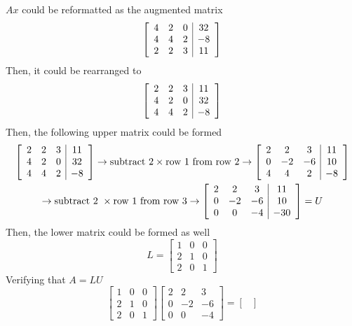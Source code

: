 \documentclass[10pt,letterpaper]{article}
\begin{document}
\begin{enumerate}
\color{TangGreen}
$Ax$ could be reformatted as the augmented matrix
$$\left[ \begin{array}{c c c | c}
4 & 2 & 0 & 32 \\
4 & 4 & 2 & -8 \\
2 & 2 & 3 & 11 
\end{array} \right]$$
Then, it could be rearranged to 
$$\left[ \begin{array}{c c c | c}
2 & 2 & 3 & 11 \\
4 & 2 & 0 & 32 \\
4 & 4 & 2 & -8 
\end{array} \right]$$
Then, the following upper matrix could be formed
\begin{gather*}
\left[ \begin{array}{c c c | c}
2 & 2 & 3 & 11 \\
4 & 2 & 0 & 32 \\
4 & 4 & 2 & -8
\end{array} \right] \rightarrow \text{subtract 2} \times \text{row 1 from row 2} \rightarrow \left[ \begin{array}{c c c | c}
2 & 2 & 3 & 11 \\
0 & -2 & -6 & 10 \\
4 & 4 & 2 & -8 
\end{array} \right] \\
\rightarrow \text{subtract 2 } \times \text{row 1 from row 3} \rightarrow \left[ \begin{array}{c c c | c}
2 & 2 & 3 & 11 \\
0 & -2 & -6 & 10 \\
0 & 0 & -4 & -30
\end{array} \right] = U
\end{gather*}
Then, the lower matrix could be formed as well
$$L = \begin{bmatrix}
1 & 0 & 0 \\
2 & 1 & 0 \\
2 & 0 & 1 	
\end{bmatrix}$$
Verifying that $A = LU$
$$\begin{bmatrix}
1 & 0 & 0 \\
2 & 1 & 0 \\
2 & 0 & 1 
\end{bmatrix}\begin{bmatrix}
2 & 2 & 3 \\
0 & -2 & -6 \\
0 & 0 & -4 
\end{bmatrix} = \begin{bmatrix}

\end{bmatrix}$$
\end{enumerate}
\end{document}
